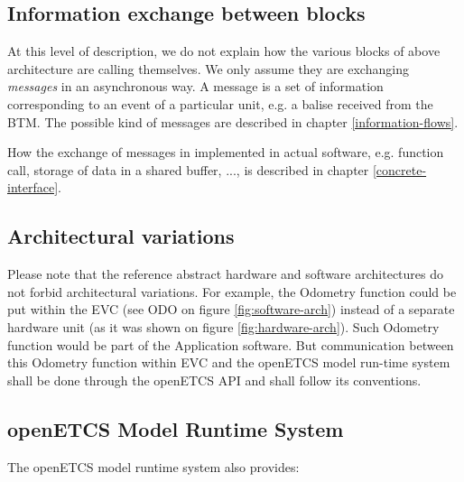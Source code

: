 \documentclass{template/openetcs_report}
\newcommand{\define}[1]{\index{#1}\emph{#1}}
\begin{document}
\subsection{Information exchange between blocks}

At this level of description, we do not explain how the various blocks
of above architecture are calling themselves. We only assume they are
exchanging \define{messages} in an asynchronous way. A message is a set
of information corresponding to an event of a particular unit, e.g. a
balise received from the BTM. The possible kind of messages are
described in chapter \ref{information-flows}.

How the exchange of messages in implemented in actual software,
e.g. function call, storage of data in a shared buffer, ..., is
described in chapter \ref{concrete-interface}.

\subsection{Architectural variations}
Please note that the reference abstract hardware and software
architectures do not forbid architectural variations. For example, the
Odometry function could be put within the EVC (see ODO on figure
\ref{fig:software-arch}) instead of a separate hardware unit (as it
was shown on figure \ref{fig:hardware-arch}). Such Odometry function
would be part of the Application software. But communication between
this Odometry function within EVC and the openETCS model run-time
system shall be done through the openETCS API and shall follow its
conventions.


\subsection{openETCS Model Runtime System}
The openETCS model runtime system also provides:
\end{document}
